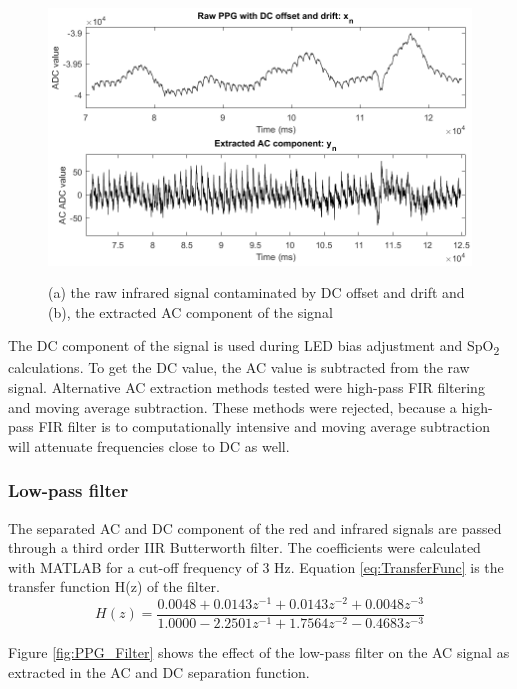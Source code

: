 \begin{figure}[H]
   \centering
   \includegraphics[width=12cm,height=7.5cm]{figs/AC_Extraction.png}
   \caption{(a) the raw infrared signal contaminated by DC offset and drift and (b), the extracted AC component of the signal}
   \label{fig:AC_Extraction}
\end{figure}

The DC component of the signal is used during LED bias adjustment and SpO\textsubscript{2} calculations. To get the DC value, the AC value is subtracted from the raw signal. Alternative AC extraction methods tested were high-pass FIR filtering and moving average subtraction. These methods were rejected, because a high-pass FIR filter is to computationally intensive and moving average subtraction will attenuate frequencies close to DC as well.

\subsubsection{Low-pass filter}
The separated AC and DC component of the red and infrared signals are passed through a third order IIR Butterworth filter. The coefficients were calculated with MATLAB for a cut-off frequency of 3 Hz. Equation \ref{eq:TransferFunc} is the transfer function H(z) of the filter.
\begin{equation}
\label{eq:TransferFunc}
H(z) = \frac{0.0048+0.0143z^{-1}+0.0143z^{-2}+0.0048z^{-3}}{1.0000-2.2501z^{-1}+1.7564z^{-2}-0.4683z^{-3}}
\end{equation}

Figure \ref{fig:PPG_Filter} shows the effect of the low-pass filter on the AC signal as extracted in the AC and DC separation function. 


